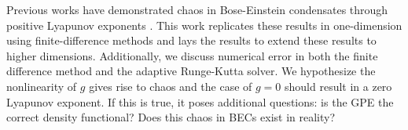 Previous works have demonstrated chaos in Bose-Einstein condensates through positive Lyapunov exponents \cite{PhysRevA.83.043611,PhysRevLett.62.2065,PhysRevLett.71.2683}. This work replicates these results in one-dimension using finite-difference methods and lays the results to extend these results to higher dimensions. Additionally, we discuss numerical error in both the finite difference method and the adaptive Runge-Kutta solver. We hypothesize the nonlinearity of $g$ gives rise to chaos and the case of $g=0$ should result in a zero Lyapunov exponent. If this is true, it poses additional questions: is the GPE the correct density functional? Does this chaos in BECs exist in reality?

